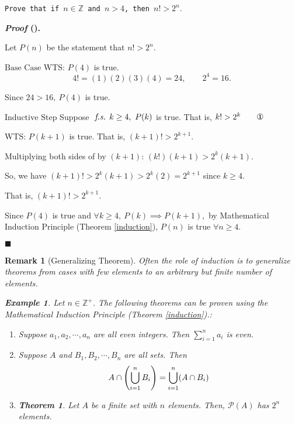 \documentclass[12pt,a4paper]{article}
\newtheorem{thm}{Theorem}[subsection]
\newtheorem{eg}{Example}[subsection]
\newcounter{nprf}[subsection]
\newtheorem*{rmk}{\indent Remark}
\newenvironment*{prf}{\par\indent\textbf{\textit{Proof} (\stepcounter{nprf}\thenprf). }\par}{\par\hfill $\blacksquare$\par}
\def\Z{{\mathbb{Z}}}
\def\Zp{{\Z^{+}}}
\def\pow{{\mathcal{P}}}
\def\fs{\emph{ f.s. }}
\begin{document}
\begin{framed}
\noindent\texttt{Prove that if $n\in\Z$ and $n>4$, then $n!>2^n.$}
\begin{prf}
	Let $P(n)$ be the statement that $n!>2^n.$\par$\boxed{\text{Base Case}}$ WTS: $P(4)$ is true. \[4!=(1)(2)(3)(4)=24,\qquad 2^4=16.\]\par\hspace{5mm} Since $24>16,\ P(4)$ is true.\par$\boxed{\text{Inductive Step}}$ Suppose $\fs k\geq4,\ P(k)$ is true. That is, $k!>2^k\qquad\text{\ding{172}}$\par\hspace{5mm} WTS: $P(k+1)$ is true. That is, $(k+1)!>2^{k+1}.$\par\hspace{5mm} Multiplying both sides of  by $(k+1)$: $(k!)(k+1)>2^k(k+1).$\par\hspace{5mm} So, we have $(k+1)!>2^k(k+1)>2^k(2)=2^{k+1}$ since $k\geq4.$\par\hspace{5mm} That is, $(k+1)!>2^{k+1}$.\par Since $P(4)$ is true and $\forall k\geq4,\ P(k)\implies P(k+1),$ by Mathematical Induction Principle (Theorem \ref{induction}), $P(n)$ is true $\forall n\geq4.$
\end{prf}
\end{framed}
\begin{rmk}[Generalizing Theorem]
	Often the role of induction is to generalize theorems from cases with few elements to an arbitrary but finite number of elements. 
\begin{eg}
	Let $n\in\Zp$. The following theorems can be proven using the Mathematical Induction Principle (Theorem \ref{induction}).: 
	\begin{enumerate}
		\item Suppose $a_1,a_2,\cdots,a_n$ are all even integers. Then $\displaystyle\sum_{i=1}^na_i$ is even.
		\item Suppose $A$ and $B_1,B_2,\cdots,B_n$ are all sets. Then \[A\cap\qty(\bigcup_{i=1}^nB_i)=\bigcup_{i=1}^n(A\cap B_i)\]
		\item \begin{thm} Let $A$ be a finite set with $n$ elements. Then, $\pow(A)$ has $2^n$ elements. \end{thm}
	\end{enumerate}
\end{eg}
\end{rmk}
\end{document}
